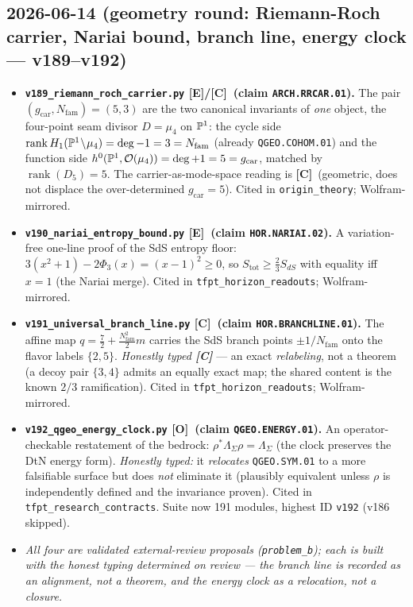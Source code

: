 \documentclass[11pt]{article}
\providecommand{\mE}{\textbf{[E]}}\providecommand{\mC}{\textbf{[C]}}
\providecommand{\mO}{\textbf{[O]}}\providecommand{\mX}{\textbf{[X]}}
\providecommand{\gcar}{g_{\mathrm{car}}}\providecommand{\Nfam}{N_{\mathrm{fam}}}
\begin{document}
\subsection*{2026-06-14 (geometry round: Riemann-Roch carrier, Nariai bound, branch line, energy clock --- v189--v192)}
\begin{itemize}
\item \textbf{\texttt{v189\_riemann\_roch\_carrier.py} \mE/\mC\ (claim \texttt{ARCH.RRCAR.01}).} The pair
  $(\gcar,\Nfam)=(5,3)$ are the two canonical invariants of \emph{one} object, the four-point seam divisor
  $D=\mu_4$ on $\mathbb{P}^1$: the cycle side $\operatorname{rank}H_1(\PP^1\!\setminus\!\mu_4)=\deg{-}1=3=\Nfam$
  (already \texttt{QGEO.COHOM.01}) and the function side $h^0(\PP^1,\mathcal O(\mu_4))=\deg{+}1=5=\gcar$,
  matched by $\operatorname{rank}(D_5)=5$. The carrier-as-mode-space reading is \mC\ (geometric, does not
  displace the over-determined $\gcar=5$). Cited in \texttt{origin\_theory}; Wolfram-mirrored.
\item \textbf{\texttt{v190\_nariai\_entropy\_bound.py} \mE\ (claim \texttt{HOR.NARIAI.02}).} A
  variation-free one-line proof of the SdS entropy floor: $3(x^2{+}1)-2\Phi_3(x)=(x{-}1)^2\ge0$, so
  $S_{\mathrm{tot}}\ge\tfrac23 S_{dS}$ with equality iff $x=1$ (the Nariai merge). Cited in
  \texttt{tfpt\_horizon\_readouts}; Wolfram-mirrored.
\item \textbf{\texttt{v191\_universal\_branch\_line.py} \mC\ (claim \texttt{HOR.BRANCHLINE.01}).} The affine
  map $q=\tfrac72+\tfrac{\Nfam^2}{2}m$ carries the SdS branch points ${\pm}1/\Nfam$ onto the flavor labels
  $\{2,5\}$. \emph{Honestly typed \mC} --- an exact \emph{relabeling}, not a theorem (a decoy pair $\{3,4\}$
  admits an equally exact map; the shared content is the known $2/3$ ramification). Cited in
  \texttt{tfpt\_horizon\_readouts}; Wolfram-mirrored.
\item \textbf{\texttt{v192\_qgeo\_energy\_clock.py} \mO\ (claim \texttt{QGEO.ENERGY.01}).} An
  operator-checkable restatement of the bedrock: $\rho^*\Lambda_\Sigma\rho=\Lambda_\Sigma$ (the clock
  preserves the DtN energy form). \emph{Honestly typed:} it \emph{relocates} \texttt{QGEO.SYM.01} to a more
  falsifiable surface but does \emph{not} eliminate it (plausibly equivalent unless $\rho$ is independently
  defined and the invariance proven). Cited in \texttt{tfpt\_research\_contracts}. Suite now 191 modules,
  highest ID \texttt{v192} (v186 skipped).
\item \emph{All four are validated external-review proposals (\texttt{problem\_b}); each is built with the
  honest typing determined on review --- the branch line is recorded as an alignment, not a theorem, and
  the energy clock as a relocation, not a closure.}
\end{itemize}
\end{document}

